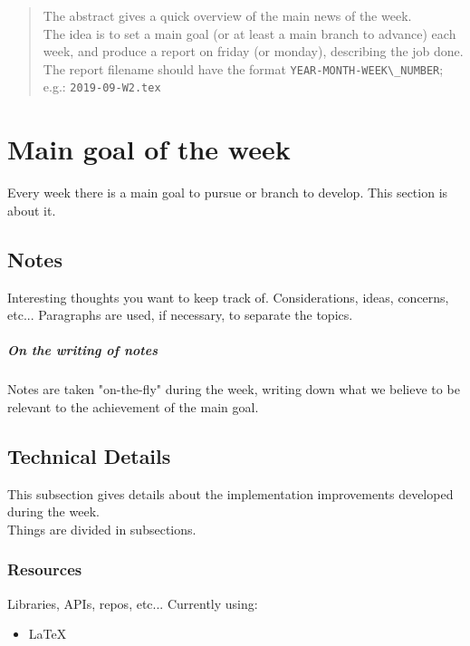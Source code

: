 


\maketitle
	
\begin{abstract}
The abstract gives a quick overview of the main news of the week.\\
The idea is to set a main goal (or at least a main branch to advance) each week,
and produce a report on friday (or monday), describing the job done.\\
The report filename should have the format \verb|YEAR-MONTH-WEEK\_NUMBER|; e.g.: \verb|2019-09-W2.tex|
\end{abstract}

\chapter{Main goal of the week} %
Every week there is a main goal to pursue or branch to develop.
This section is about it.
\section{Notes}
Interesting thoughts you want to keep track of.
Considerations, ideas, concerns, etc...
Paragraphs are used, if necessary, to separate the topics.
\paragraph{On the writing of notes}
Notes are taken "on-the-fly" during the week, writing down what we believe to be relevant to the achievement of the main goal.
\section{Technical Details}
This subsection gives details about the implementation improvements developed during the week.\\
%
Things are divided in subsections.
\subsection{Resources}
Libraries, APIs, repos, etc...
Currently using:
\begin{itemize}
  \item LaTeX
\end{itemize}

